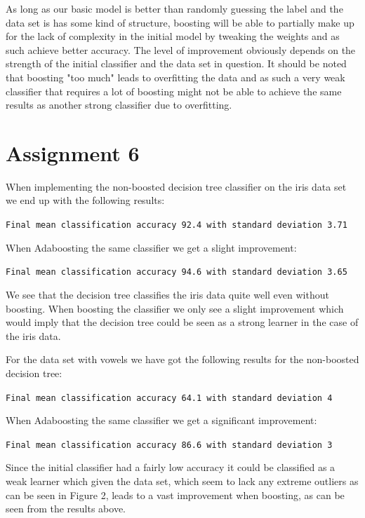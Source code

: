 \documentclass{article}
\begin{document}
As long as our basic model is better than randomly guessing the label and the data set is has some kind of structure, boosting will be able to partially make up for the lack of complexity in the initial model by tweaking the weights and as such achieve better accuracy. The level of improvement obviously depends on the strength of the initial classifier and the data set in question. It should be noted that boosting "too much" leads to overfitting the data and as such a very weak classifier that requires a lot of boosting might not be able to achieve the same results as another strong classifier due to overfitting.


\section*{Assignment 6}

When implementing the non-boosted decision tree classifier on the iris data set we end up with the following results:

\texttt{Final mean classification accuracy  92.4 with standard deviation 3.71}

When Adaboosting the same classifier we get a slight improvement:

\texttt{Final mean classification accuracy  94.6 with standard deviation 3.65}

We see that the decision tree classifies the iris data quite well even without boosting. When boosting the classifier we only see a slight improvement which would imply that the decision tree could be seen as a strong learner in the case of the iris data.

For the data set with vowels we have got the following results for the non-boosted decision tree:

\texttt{Final mean classification accuracy  64.1 with standard deviation 4}

When Adaboosting the same classifier we get a significant improvement:

\texttt{Final mean classification accuracy  86.6 with standard deviation 3}

Since the initial classifier had a fairly low accuracy it could be classified as a weak learner which given the data set, which seem to lack any extreme outliers as can be seen in Figure 2, leads to a vast improvement when boosting, as can be seen from the results above.
\end{document}
